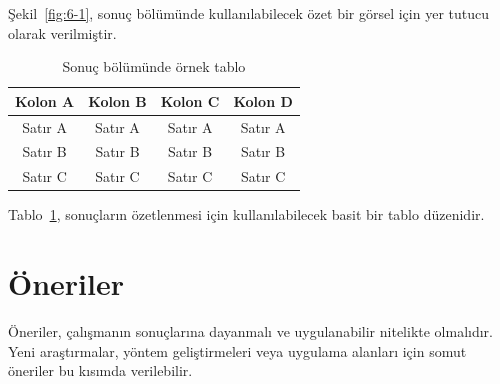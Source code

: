 \documentclass[12pt,a4paper]{report}
\begin{document}
\c{S}ekil~\ref{fig:6-1}, sonu\c{c} b\"{o}l\"{u}m\"{u}nde kullan\i{}labilecek \"{o}zet bir g\"{o}rsel i\c{c}in yer tutucu olarak verilmi\c{s}tir.

\begin{table}[!ht]
{\setlength{\tabcolsep}{14pt}
\caption{Sonu\c{c} b\"{o}l\"{u}m\"{u}nde \"{o}rnek tablo}
\noindent
\begin{tabular}{cccc}
\hline\hline
Kolon A & Kolon B & Kolon C & Kolon D \\
\hline
Sat\i{}r A & Sat\i{}r A & Sat\i{}r A & Sat\i{}r A \\
Sat\i{}r B & Sat\i{}r B & Sat\i{}r B & Sat\i{}r B \\
Sat\i{}r C & Sat\i{}r C & Sat\i{}r C & Sat\i{}r C \\
\hline
\end{tabular}
\par
\label{tableforCh6-1}}
\end{table}

Tablo~\ref{tableforCh6-1}, sonu\c{c}lar\i{}n \"{o}zetlenmesi i\c{c}in kullan\i{}labilecek basit bir tablo d\"{u}zenidir.

\section{\"{O}neriler}

\"{O}neriler, \c{c}al\i{}\c{s}man\i{}n sonu\c{c}lar\i{}na dayanmal\i{} ve uygulanabilir nitelikte olmal\i{}d\i{}r. Yeni ara\c{s}t\i{}rmalar, y\"{o}ntem geli\c{s}tirmeleri veya uygulama alanlar\i{} i\c{c}in somut \"{o}neriler bu k\i{}s\i{}mda verilebilir.
\end{document}
